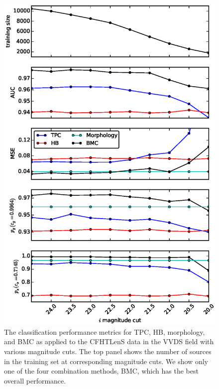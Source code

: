 \documentclass[useAMS,usenatbib]{mn2e}
\begin{document}
\begin{figure}
    \includegraphics[width=\linewidth]{figures/perform_mag_cut.eps}
    \caption{The classification performance metrics for TPC, HB, morphology,
      and BMC as applied to the CFHTLenS data in the VVDS field
      with various magnitude cuts.
      The top panel shows the number of sources in the training set
      at corresponding magnitude cuts.
      We show only one of the four combination methods, BMC,
      which has the best overall performance.}
    \label{fig:perform_mag_cut}
\end{figure}
\end{document}
